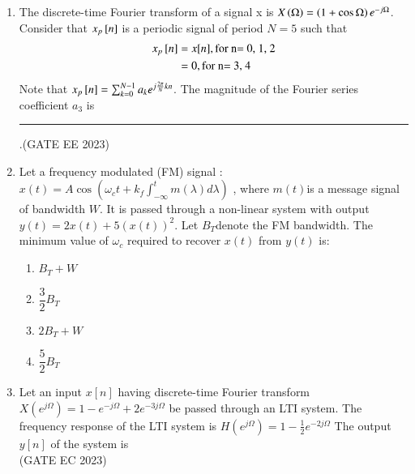 \begin{enumerate}[label=\thechapter.\arabic*,ref=\thechapter.\theenumi]
    \item The discrete-time Fourier transform of a signal x is $X\left(\Omega\right)=\left(1+\cos{\Omega}\right)e^{-j\Omega}$. Consider that $x_{p}{}\left[n\right]$ is a periodic signal of period $N=5$ such that
        \begin{align}
            x_p{}\left[n\right]&=x[n],\text{for n= 0, 1, 2}\\
            &=0,\text{for n= 3, 4}
        \end{align}
        Note that $x_p{}\left[n\right]=\sum_{k=0}^{N-1}a_{k}e^{j\frac{2\pi}{N}kn}$. The magnitude of the Fourier series coefficient $a_3$ is \rule{3cm}{0.15mm} .\hfill(GATE EE 2023)
        \solution
        \newpage

\item Let a frequency modulated (FM) signal : $ x(t) = A \cos(\omega_c t + k_f \int_{-\infty}^{t} m(\lambda) d\lambda)$ , where $ m(t) $is a message signal of bandwidth $ W $. It is passed through a non-linear system with output $y(t) = 2x(t) + 5(x(t))^2 $.
Let $B_T $denote the FM bandwidth. The minimum value of $ \omega_c $ required to recover $ x(t) $ from $ y(t) $ is:\\
\begin{enumerate}[label = (\Alph*)]
\item $B_T + W$ \\
\item $\dfrac{3}{2} B_T$ \\
\item $2B_T + W$ \\
\item $\dfrac{5}{2} B_T$ \\
\end{enumerate}

\solution
\newpage

\item Let an input $x[n]$ having discrete-time Fourier transform
$X(e^{j\Omega}) = 1 - e^{-j\Omega} + 2e^{-3j\Omega}$
be passed through an LTI system. The frequency response of the LTI system is 
$H(e^{j\Omega}) = 1 - \frac{1}{2} e^{-2j\Omega}$
The output $y[n]$ of the system is \\ \hfill(GATE EC 2023)
\solution 
\newpage


\end{enumerate}
